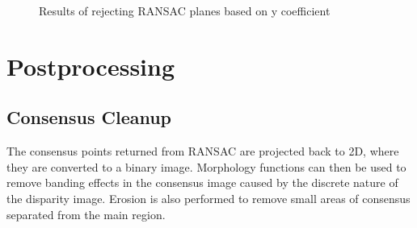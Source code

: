 \documentclass[10pt]{article}
\begin{document}
    \begin{figure}[!h]
        \centering
        \hfill
        \caption{Results of rejecting RANSAC planes based on y coefficient}
    \end{figure}

\section *{Postprocessing}

\subsection *{Consensus Cleanup}
    The consensus points returned from RANSAC are projected back to 2D, where they are converted to a binary image. Morphology functions can then be used to remove banding effects in the consensus image caused by the discrete nature of the disparity image. Erosion is also performed to remove small areas of consensus separated from the main region.
\end{document}
